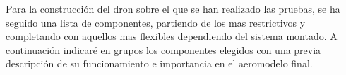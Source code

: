 
 Para la construcción del dron sobre el que se han realizado las pruebas, se ha seguido una lista de componentes, partiendo de los mas restrictivos y completando con aquellos mas flexibles dependiendo del sistema montado.
 A continuación indicaré en grupos los componentes elegidos con una previa descripción de su funcionamiento e importancia en el aeromodelo final.
 